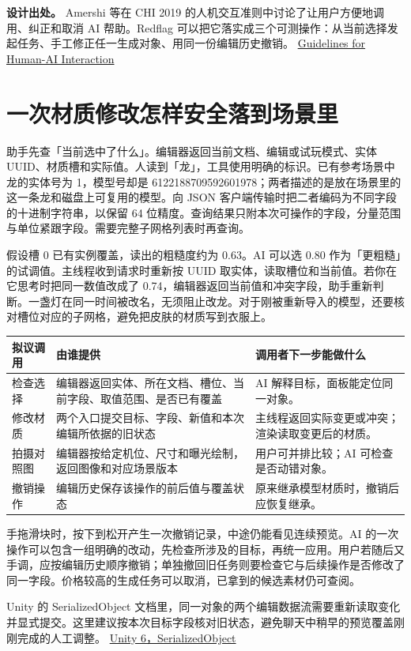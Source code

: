 \documentclass[UTF8,11pt,fontset=fandol,a4paper]{ctexart}
\newcommand{\src}[2]{\href{#1}{#2}}
\newcommand{\pg}[1]{\clearpage\section{#1}}
\begin{document}
\textbf{设计出处。} Amershi 等在 CHI 2019 的人机交互准则中讨论了让用户方便地调用、纠正和取消 AI 帮助。Redflag 可以把它落实成三个可测操作：从当前选择发起任务、手工修正任一生成对象、用同一份编辑历史撤销。 \src{https://www.microsoft.com/en-us/research/publication/guidelines-for-human-ai-interaction/}{Guidelines for Human-AI Interaction}

\pg{一次材质修改怎样安全落到场景里}
助手先查「当前选中了什么」。编辑器返回当前文档、编辑或试玩模式、实体 UUID、材质槽和实际值。人读到「龙」，工具使用明确的标识。已有参考场景中龙的实体号为 1，模型号却是 6122188709592601978；两者描述的是放在场景里的这一条龙和磁盘上可复用的模型。向 JSON 客户端传输时把二者编码为不同字段的十进制字符串，以保留 64 位精度。查询结果只附本次可操作的字段，分量范围与单位紧跟字段。需要完整子网格列表时再查询。

假设槽 0 已有实例覆盖，读出的粗糙度约为 0.63。AI 可以选 0.80 作为「更粗糙」的试调值。主线程收到请求时重新按 UUID 取实体，读取槽位和当前值。若你在它思考时把同一数值改成了 0.74，编辑器返回当前值和冲突字段，助手重新判断。一盏灯在同一时间被改名，无须阻止改龙。对于刚被重新导入的模型，还要核对槽位对应的子网格，避免把皮肤的材质写到衣服上。

\begin{center}\small
\begin{tabularx}{\linewidth}{@{}p{28mm}XX@{}}\toprule
拟议调用 & 由谁提供 & 调用者下一步能做什么\\\midrule
检查选择 & 编辑器返回实体、所在文档、槽位、当前字段、取值范围、是否已有覆盖 & AI 解释目标，面板能定位同一对象。\\
修改材质 & 两个入口提交目标、字段、新值和本次编辑所依据的旧状态 & 主线程返回实际变更或冲突；渲染读取变更后的材质。\\
拍摄对照图 & 编辑器按给定机位、尺寸和曝光绘制，返回图像和对应场景版本 & 用户可并排比较；AI 可检查是否动错对象。\\
撤销操作 & 编辑历史保存该操作的前后值与覆盖状态 & 原来继承模型材质时，撤销后应恢复继承。\\
\bottomrule\end{tabularx}\end{center}

手拖滑块时，按下到松开产生一次撤销记录，中途仍能看见连续预览。AI 的一次操作可以包含一组明确的改动，先检查所涉及的目标，再统一应用。用户若随后又手调，应按编辑历史顺序撤销；单独撤回旧任务则要检查它与后续操作是否修改了同一字段。价格较高的生成任务可以取消，已拿到的候选素材仍可查阅。

Unity 的 SerializedObject 文档里，同一对象的两个编辑数据流需要重新读取变化并显式提交。这里建议按本次目标字段核对旧状态，避免聊天中稍早的预览覆盖刚刚完成的人工调整。 \src{https://docs.unity3d.com/6000.0/Documentation/ScriptReference/SerializedObject.html}{Unity 6，SerializedObject}
\end{document}
